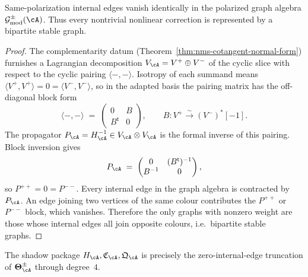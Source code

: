 \begin{theorem}
\label{thm:nms-bipartite-vanishing}
Same-polarization internal edges vanish identically in the polarized graph algebra $\mathcal G^{\pm}_{\mathrm{mod}}(\cA)$. Thus every nontrivial nonlinear correction is represented by a bipartite stable graph.
\end{theorem}
\begin{proof}
The complementarity datum (Theorem~\ref{thm:nms-cotangent-normal-form}) furnishes a Lagrangian decomposition $V_{\cA}=V^+\oplus V^-$ of the cyclic slice with respect to the cyclic pairing $\langle{-},{-}\rangle$. Isotropy of each summand means $\langle V^+,V^+\rangle=0=\langle V^-,V^-\rangle$, so in the adapted basis the pairing matrix has the off-diagonal block form
\[
\langle{-},{-}\rangle
\;=\;
\begin{pmatrix}0&B\\B^{\mathsf t}&0\end{pmatrix},
\qquad
B\colon V^+\xrightarrow{\sim}(V^-)^*[-1].
\]
The propagator $P_{\cA}=H_{\cA}^{-1}\in V_{\cA}\otimes V_{\cA}$ is the formal inverse of this pairing. Block inversion gives
\[
P_{\cA}
\;=\;
\begin{pmatrix}0&(B^{\mathsf t})^{-1}\\B^{-1}&0\end{pmatrix},
\]
so $P^{++}=0=P^{--}$. Every internal edge in the graph algebra is contracted by~$P_{\cA}$. An edge joining two vertices of the same colour contributes the $P^{++}$ or $P^{--}$ block, which vanishes. Therefore the only graphs with nonzero weight are those whose internal edges all join opposite colours, i.e.\ bipartite stable graphs.
\end{proof}

\begin{conjecture}
\label{conj:nms-quartic-lift}
The shadow package $H_{\cA},\mathfrak C_{\cA},\mathfrak Q_{\cA}$ is precisely the zero-internal-edge truncation of $\boldsymbol\Theta_{\cA}^{\pm}$ through degree~$4$.
\end{conjecture}


